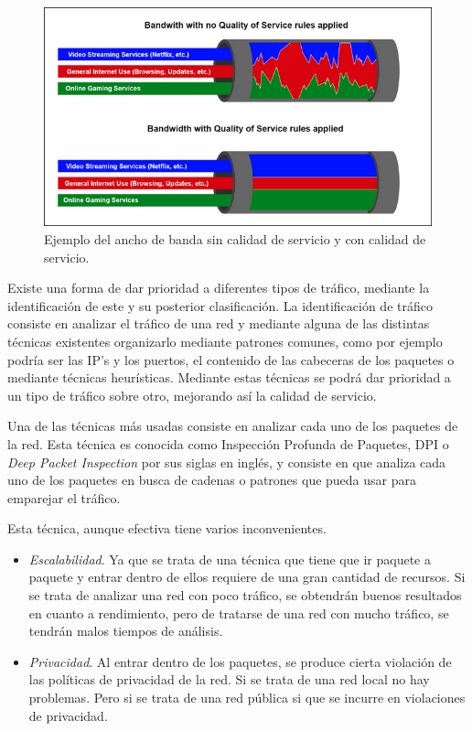\begin{figure}[H]
  \includegraphics[width=1\textwidth]{imagenes/calidadservicio.png}
  \centering
  \caption{Ejemplo del ancho de banda sin calidad de servicio y con calidad de servicio.}\label{Figura 1}
\end{figure}

\intro Existe una forma de dar prioridad a diferentes tipos de tráfico, mediante la identificación de este y su posterior 
clasificación. La identificación de tráfico consiste en analizar el tráfico de una red y mediante alguna de las distintas 
técnicas existentes organizarlo mediante patrones comunes, como por ejemplo podría ser las IP's y los puertos, el contenido de las 
cabeceras de los paquetes o mediante técnicas heurísticas. Mediante estas técnicas se podrá dar prioridad a un tipo 
de tráfico sobre otro, mejorando así la calidad de servicio.

\intro Una de las técnicas más usadas consiste en analizar cada uno de los paquetes de la red. Esta técnica es conocida como 
Inspección Profunda de Paquetes, DPI o \textit{Deep Packet Inspection} \cite{dpiaproximacion} por sus siglas en inglés, 
y consiste en que analiza cada uno de los paquetes en busca de cadenas o patrones que pueda usar para emparejar el tráfico.

\intro Esta técnica, aunque efectiva tiene varios inconvenientes.
\begin{itemize}
\item \textit{Escalabilidad}. Ya que se trata de una técnica que tiene que ir paquete a paquete y entrar dentro de ellos requiere de 
una gran cantidad de recursos. Si se trata de analizar una red con poco tráfico, se obtendrán buenos resultados en cuanto a 
rendimiento, pero de tratarse de una red con mucho tráfico, se tendrán malos tiempos de análisis.
\item \textit{Privacidad}. Al entrar dentro de los paquetes, se produce cierta violación de las políticas de privacidad de la red. Si 
se trata de una red local no hay problemas. Pero si se trata de una red pública si que se incurre en violaciones de privacidad.
\end{itemize}

